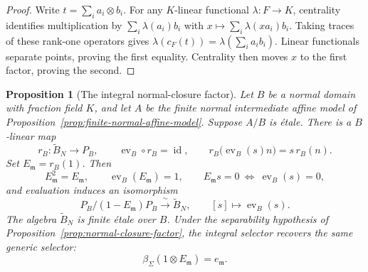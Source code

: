\documentclass[11pt]{article}
\newtheorem{proposition}[theorem]{Proposition}
\theoremstyle{definition}
\theoremstyle{remark}
\begin{document}
\begin{proof}
Write \(t=\sum_i a_i\otimes b_i\). For any \(K\)-linear functional
\(\lambda:F\to K\), centrality identifies multiplication by
\(\sum_i\lambda(a_i)b_i\) with
\(x\mapsto\sum_i\lambda(xa_i)b_i\).
Taking traces of these rank-one operators gives
\(\lambda(c_F(t))=\lambda(\sum_i a_ib_i)\). Linear functionals
separate points, proving the first equality. Centrality then moves
\(x\) to the first factor, proving the second.
\end{proof}

\begin{proposition}[The integral normal-closure factor]
\label{prop:normalization-integral-factor}
Let \(B\) be a normal domain with fraction field \(K\), and let
\(A\) be the finite normal intermediate affine model of
Proposition~\ref{prop:finite-normal-affine-model}. Suppose \(A/B\)
is \'{e}tale. There is a \(B\)-linear map
\[
  r_B:\widetilde B_N\longrightarrow P_B,
  \qquad \operatorname{ev}_B\circ r_B=\operatorname{id},
  \qquad r_B\bigl(\operatorname{ev}_B(s)n\bigr)=s\,r_B(n).
\]
Set \(E_{\mathfrak m}=r_B(1)\). Then
\[
  E_{\mathfrak m}^2=E_{\mathfrak m},\qquad
  \operatorname{ev}_B(E_{\mathfrak m})=1,\qquad
  E_{\mathfrak m}s=0\ \Longleftrightarrow\ \operatorname{ev}_B(s)=0,
\]
and evaluation induces an isomorphism
\[
  P_B/(1-E_{\mathfrak m})P_B\xrightarrow{\ \sim\ }\widetilde B_N,
  \qquad [s]\longmapsto\operatorname{ev}_B(s).
\]
The algebra \(\widetilde B_N\) is finite \'{e}tale over \(B\).
Under the separability hypothesis of
Proposition~\ref{prop:normal-closure-factor}, the integral selector
recovers the same generic selector:
\[
  \beta_\Sigma(1\otimes E_{\mathfrak m})=e_{\mathfrak m}.
\]
\end{proposition}
\end{document}
